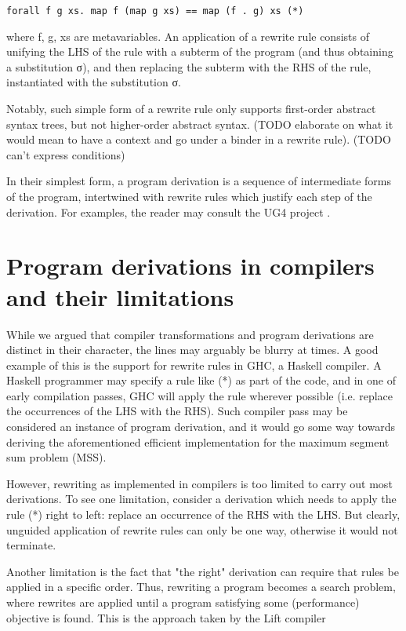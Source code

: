 \documentclass[bsc,frontabs,twoside,singlespacing,parskip,deptreport]{infthesis}
\theoremstyle{definition}
\begin{document}
\begin{verbatim}
forall f g xs. map f (map g xs) == map (f . g) xs (*)
\end{verbatim}

where f, g, xs are metavariables. An application of a rewrite rule
consists of unifying the LHS of the rule with a subterm of the program
(and thus obtaining a substitution σ), and then replacing the
subterm with the RHS of the rule, instantiated with the substitution
σ.

Notably, such simple form of a rewrite rule only supports first-order
abstract syntax trees, but not higher-order abstract syntax. (TODO
elaborate on what it would mean to have a context and go under a
binder in a rewrite rule). (TODO can't express conditions)

In their simplest form, a program derivation is a sequence of
intermediate forms of the program, intertwined with rewrite rules
which justify each step of the derivation. For examples, the reader
may consult the UG4 project \cite{TODO}.

\section{Program derivations in compilers and their limitations}
\label{sec:progr-deriv-comp}

While we argued that compiler transformations and program derivations
are distinct in their character, the lines may arguably be blurry at
times. A good example of this is the support for rewrite rules in GHC,
a Haskell compiler. A Haskell programmer may specify a rule like (*)
as part of the code, and in one of early compilation passes, GHC will
apply the rule wherever possible (i.e. replace the occurrences of the
LHS with the RHS). Such compiler pass may be considered an instance of
program derivation, and it would go some way towards deriving the
aforementioned efficient implementation for the maximum segment sum
problem (MSS).

However, rewriting as implemented in compilers is too limited to carry
out most derivations. To see one limitation, consider a derivation
which needs to apply the rule (*) right to left: replace an occurrence
of the RHS with the LHS. But clearly, unguided application of rewrite
rules can only be one way, otherwise it would not terminate.

Another limitation is the fact that "the right" derivation can require
that rules be applied in a specific order. Thus, rewriting a program
becomes a search problem, where rewrites are applied until a program
satisfying some (performance) objective is found. This is the approach
taken by the Lift compiler \cite{TODO}
\end{document}
